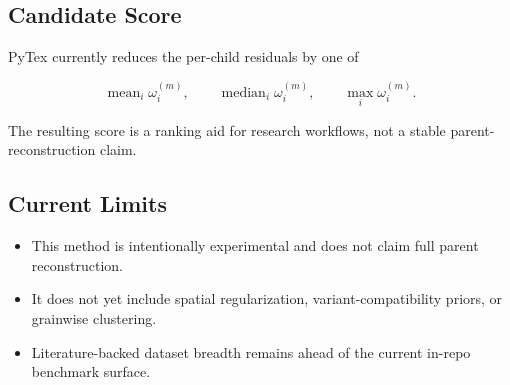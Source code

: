 \subsection{Candidate Score}

PyTex currently reduces the per-child residuals by one of

\[
\operatorname{mean}_i \omega_i^{(m)}, \qquad
\operatorname{median}_i \omega_i^{(m)}, \qquad
\max_i \omega_i^{(m)}.
\]

The resulting score is a ranking aid for research workflows, not a stable parent-reconstruction
claim.

\subsection{Current Limits}

\begin{itemize}
  \item This method is intentionally experimental and does not claim full parent reconstruction.
  \item It does not yet include spatial regularization, variant-compatibility priors, or grainwise
    clustering.
  \item Literature-backed dataset breadth remains ahead of the current in-repo benchmark surface.
\end{itemize}
